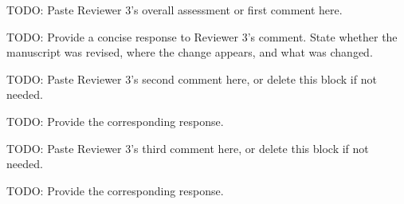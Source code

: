 \reviewer

\begin{revcomment}
TODO: Paste Reviewer 3's overall assessment or first comment here.
\end{revcomment}
\begin{revresponse}
TODO: Provide a concise response to Reviewer 3's comment. State whether the manuscript was revised, where the change appears, and what was changed.
\end{revresponse}

\begin{revcomment}
TODO: Paste Reviewer 3's second comment here, or delete this block if not needed.
\end{revcomment}
\begin{revresponse}
TODO: Provide the corresponding response.
\end{revresponse}

\begin{revcomment}
TODO: Paste Reviewer 3's third comment here, or delete this block if not needed.
\end{revcomment}
\begin{revresponse}
TODO: Provide the corresponding response.
\end{revresponse}
